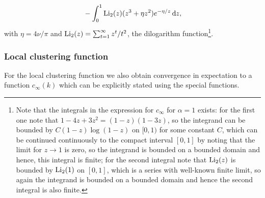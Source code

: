 \begin{theorem}
\begin{align*}
	&\hspace{10pt}- \int_0^1 \operatorname{Li}_2(z)(z^3 + \eta z^2) e^{-\eta/z} \operatorname{\mathrm{d}\hspace{-2pt}} z,		
\end{align*}
with $\eta = 4\nu/\pi$ and $\operatorname{Li}_2(z) = \sum_{t = 1}^\infty z^t/t^2$, the dilogarithm function\footnote{Note that the integrals in the expression for $c_\infty$ for $\alpha = 1$ exists: for the first one note that $1-4z+3z^2=(1-z)(1-3z)$, so the integrand can be bounded by $C(1-z)\log(1-z)$ on $[0,1)$ for some constant $C$, which can be continued continuously to the compact interval $[0,1]$ by noting that the limit for $z \rightarrow 1$ is zero, so the integrand is bounded on a bounded domain and hence, this integral is finite; for the second integral note that $\operatorname{Li}_2(z)$ is bounded by $\operatorname{Li}_2(1)$ on $[0,1]$, which is a series with well-known finite limit, so again the integrand is bounded on a bounded domain and hence the second integral is also finite.}.
\end{theorem}

\subsubsection{Local clustering function}

For the local clustering function we also obtain convergence in expectation to a function $c_\infty(k)$ which can be explicitly stated using the special functions.

